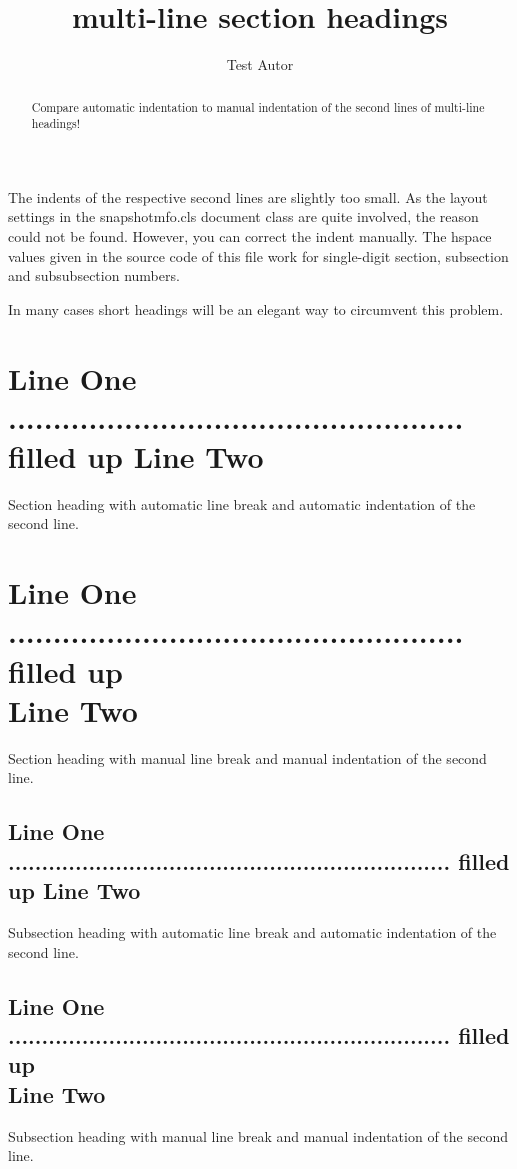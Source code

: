 \documentclass{snapshotmfo}
\author{Test Autor}
\title{multi-line section headings}
\begin{document}

\begin{abstract}
Compare automatic indentation to manual indentation of the second lines of multi-line headings!\end{abstract}

The indents of the respective second lines are slightly too small. As the layout settings in the snapshotmfo.cls document class are quite involved, the reason could not be found. However, you can correct the indent manually. The hspace values given in the source code of this file work for single-digit section, subsection and subsubsection numbers.

In many cases short headings will be an elegant way to circumvent this problem.

\section[Line One ... filled up Line Two]{Line One ................................................... filled up Line Two}
Section heading with automatic line break and automatic indentation of the second line.

\section[Line One ... filled up Line Two]{Line One ................................................... filled up\\
\hspace{12.58pt}Line Two}
Section heading with manual line break and manual indentation of the second line.

\subsection[Line One ... filled up Line Two]{Line One .................................................................. filled up Line Two}
Subsection heading with automatic line break and automatic indentation of the second line.

\subsection[Line One ... filled up Line Two]{Line One .................................................................. filled up\\
\hspace{19.8pt}Line Two}
Subsection heading with manual line break and manual indentation of the second line.
\end{document}
